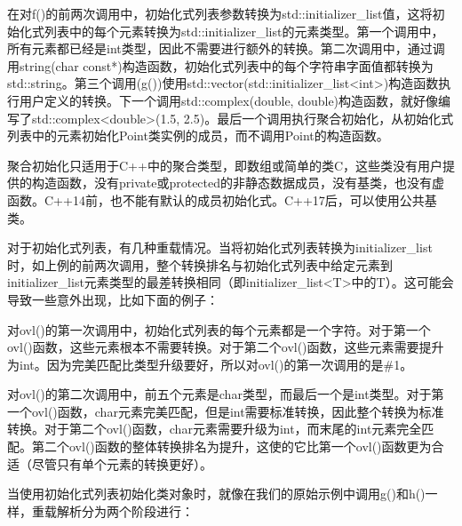 在对f()的前两次调用中，初始化式列表参数转换为std::initializer\_list值，这将初始化式列表中的每个元素转换为std::initializer\_list的元素类型。第一个调用中，所有元素都已经是int类型，因此不需要进行额外的转换。第二次调用中，通过调用string(char const*)构造函数，初始化式列表中的每个字符串字面值都转换为std::string。第三个调用(g())使用std::vector(std::initializer\_list<int>)构造函数执行用户定义的转换。下一个调用std::complex(double, double)构造函数，就好像编写了std::complex<double>(1.5, 2.5)。最后一个调用执行聚合初始化，从初始化式列表中的元素初始化Point类实例的成员，而不调用Point的构造函数。

\begin{notice}
聚合初始化只适用于C++中的聚合类型，即数组或简单的类C，这些类没有用户提供的构造函数，没有private或protected的非静态数据成员，没有基类，也没有虚函数。C++14前，也不能有默认的成员初始化式。C++17后，可以使用公共基类。
\end{notice}

对于初始化式列表，有几种重载情况。当将初始化式列表转换为initializer\_list时，如上例的前两次调用，整个转换排名与初始化式列表中给定元素到initializer\_list元素类型的最差转换相同（即initializer\_list<T>中的T）。这可能会导致一些意外出现，比如下面的例子：


对ovl()的第一次调用中，初始化式列表的每个元素都是一个字符。对于第一个ovl()函数，这些元素根本不需要转换。对于第二个ovl()函数，这些元素需要提升为int。因为完美匹配比类型升级要好，所以对ovl()的第一次调用的是\#1。

对ovl()的第二次调用中，前五个元素是char类型，而最后一个是int类型。对于第一个ovl()函数，char元素完美匹配，但是int需要标准转换，因此整个转换为标准转换。对于第二个ovl()函数，char元素需要升级为int，而末尾的int元素完全匹配。第二个ovl()函数的整体转换排名为提升，这使的它比第一个ovl()函数更为合适（尽管只有单个元素的转换更好）。

当使用初始化式列表初始化类对象时，就像在我们的原始示例中调用g()和h()一样，重载解析分为两个阶段进行：


